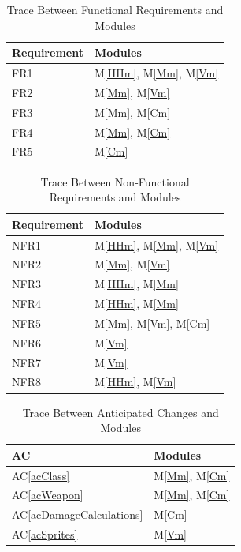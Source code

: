 \documentclass{article}
\newcommand{\acref}[1]{AC\ref{#1}}
\newcommand{\mref}[1]{M\ref{#1}}
\begin{document}
\begin{table}[H]
    \centering
    \begin{tabular}{p{} p{}}
        \toprule
        \textbf{Requirement} & \textbf{Modules} \\
        \midrule
        FR1 & \mref{HHm}, \mref{Mm}, \mref{Vm} \\
        FR2 & \mref{Mm}, \mref{Vm} \\
        FR3 & \mref{Mm}, \mref{Cm} \\
        FR4 & \mref{Mm}, \mref{Cm} \\
        FR5 & \mref{Cm} \\
        \bottomrule
    \end{tabular}
    \caption{Trace Between Functional Requirements and Modules}
    \label{TblRT}
\end{table}

\begin{table}[H]
    \centering
    \begin{tabular}{p{} p{}}
        \toprule
        \textbf{Requirement} & \textbf{Modules} \\
        \midrule
        NFR1 & \mref{HHm}, \mref{Mm}, \mref{Vm} \\
        NFR2 & \mref{Mm}, \mref{Vm} \\
        NFR3 & \mref{HHm}, \mref{Mm} \\
        NFR4 & \mref{HHm}, \mref{Mm} \\
        NFR5 & \mref{Mm}, \mref{Vm}, \mref{Cm} \\
        NFR6 & \mref{Vm} \\
        NFR7 & \mref{Vm} \\
        NFR8 & \mref{HHm}, \mref{Vm} \\
        \bottomrule
    \end{tabular}
    \caption{Trace Between Non-Functional Requirements and Modules}
    \label{TblNFRT}
\end{table}

\begin{table}[H]
    \centering
    \begin{tabular}{p{} p{}}
        \toprule
        \textbf{AC} & \textbf{Modules} \\
        \midrule
        \acref{acClass} & \mref{Mm}, \mref{Cm} \\
        \acref{acWeapon} & \mref{Mm}, \mref{Cm} \\
        \acref{acDamageCalculations} & \mref{Cm} \\
        \acref{acSprites} & \mref{Vm} \\
        \bottomrule
    \end{tabular}
    \caption{Trace Between Anticipated Changes and Modules}
    \label{TblACT}
\end{table}
\end{document}
